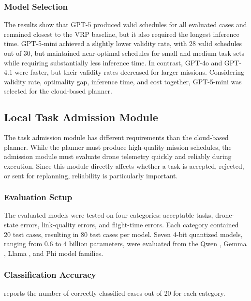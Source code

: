 

\subsubsection{Model Selection}
The results show that GPT-5 produced valid schedules for all evaluated cases and remained
closest to the VRP baseline, but it also required the longest inference time. GPT-5-mini
achieved a slightly lower validity rate, with 28 valid schedules out of 30, but maintained
near-optimal schedules for small and medium task sets while requiring substantially less
inference time. In contrast, GPT-4o and GPT-4.1 were faster, but their validity rates decreased
for larger missions. Considering validity rate, optimality gap, inference time, and cost
together, GPT-5-mini was selected for the cloud-based planner.

\subsection{Local Task Admission Module}
The task admission module has different requirements than the cloud-based planner. While the
planner must produce high-quality mission schedules, the admission module must evaluate drone telemetry
quickly and reliably during execution. Since this module directly affects whether a task is accepted,
rejected, or sent for replanning, reliability is particularly important.

\subsubsection{Evaluation Setup}
The evaluated models were tested on four categories: acceptable tasks, drone-state errors,
link-quality errors, and flight-time errors. Each category contained 20 test cases, resulting in 80
test cases per model. Seven 4-bit quantized models, ranging from 0.6 to 4 billion parameters, were
evaluated from the Qwen \cite{ollama_qwen25,ollama_qwen3}, Gemma \cite{ollama_gemma3},
Llama \cite{ollama_llama32}, and Phi \cite{ollama_phi4} model families.

\subsubsection{Classification Accuracy}
 reports the number of correctly classified cases out of 20 for each category. 



